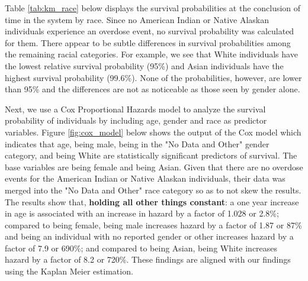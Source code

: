 \documentclass[twoside,10.5pt]{article}
\begin{document}
Table \ref{tab:km_race} below displays the survival probabilities at the conclusion of time in the system by race. Since no American Indian or Native Alaskan individuals experience an overdose event, no survival probability was calculated for them. There appear to be subtle differences in survival probabilities among the remaining racial categories. For example, we see that White individuals have the lowest relative survival probability (95\%) and Asian individuals have the highest survival probability (99.6\%). None of the probabilities, however, are lower than 95\% and the differences are not as noticeable as those seen by gender alone. 
\vspace*{2.5px}

\begin{table}[h!]
  \begin{center}
    \caption{Probability of survival by Race}
    \label{tab:km_race}
  \end{center}
\end{table}

Next, we use a Cox Proportional Hazards model to analyze the survival probability of individuals by including age, gender and race as predictor variables. Figure \ref{fig:cox_model} below shows the output of the Cox model which indicates that age, being male, being in the "No Data and Other" gender category, and being White are statistically significant predictors of survival. The base variables are being female and being Asian. Given that there are no overdose events for the American Indian or Native Alaskan individuals, their data was merged into the "No Data and Other" race category so as to not skew the results. \\

The results show that, \textbf{holding all other things constant}: a one year increase in age is associated with an increase in hazard by a factor of 1.028 or 2.8\%; compared to being female, being male increases hazard by a factor of 1.87 or 87\% and being an individual with no reported gender or other increases hazard by a factor of 7.9 or 690\%; and compared to being Asian, being White increases hazard by a factor of 8.2 or 720\%. These findings are aligned with our findings using the Kaplan Meier estimation. \\
\end{document}
